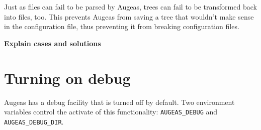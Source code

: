 Just as files can fail to be parsed by Augeas, trees can fail to be transformed back into files, too. This prevents Augeas from saving a tree that wouldn't make sense in the configuration file, thus preventing it from breaking configuration files.

\textbf{Explain cases and solutions}

\section{Turning on debug}

 

Augeas has a debug facility that is turned off by default. Two environment variables control the activate of this functionality: \verb!AUGEAS_DEBUG! and \verb!AUGEAS_DEBUG_DIR!.


